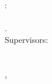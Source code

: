 \thispagestyle{empty}

\hfill

\vfill

\noindent\spacedlowsmallcaps{\myName}: \\
\textit{\myTitle} \\
{\small\textit{\mySubtitle}}. \\[\baselineskip]
\noindent Supervisors: \\
{\spacedlowsmallcaps{\myProf} \\
\spacedlowsmallcaps{\myOtherProf}} \\[\baselineskip]
\myLocation, \myTime
